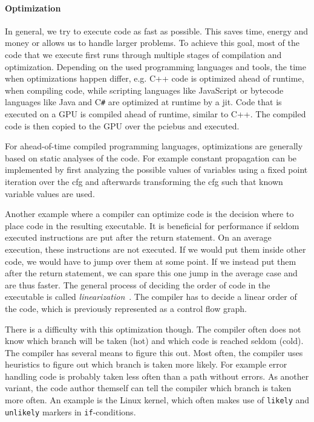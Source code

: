 \paragraph{Optimization} In general, we try to execute code as fast as possible. This saves time, energy and money or allows us to handle larger problems. To achieve this goal, most of the code that we execute first runs through multiple stages of compilation and optimization. Depending on the used programming languages and tools, the time when optimizations happen differ, e.g. C++ code is optimized ahead of runtime, when compiling code, while scripting languages like JavaScript or bytecode languages like Java and C\texttt{\#} are optimized at runtime by a \gls{jit}. Code that is executed on a GPU is compiled ahead of runtime, similar to C++. The compiled code is then copied to the GPU over the \gls{pciebus} and executed.

For ahead-of-time compiled programming languages, optimizations are generally based on static analyses of the code. For example constant propagation can be implemented by first analyzing the possible values of variables using a fixed point iteration over the \gls{cfg} and afterwards transforming the \gls{cfg} such that known variable values are used.~\cite{Seidl2010}

Another example where a compiler can optimize code is the decision where to place code in the resulting executable. It is beneficial for performance if seldom executed instructions are put after the return statement. On an average execution, these instructions are not executed. If we would put them inside other code, we would have to jump over them at some point. If we instead put them after the return statement, we can spare this one jump in the average case and are thus faster. The general process of deciding the order of code in the executable is called \emph{linearization}~\cite{Seidl2010}. The compiler has to decide a linear order of the code, which is previously represented as a control flow graph.

There is a difficulty with this optimization though. The compiler often does not know which branch will be taken (hot) and which code is reached seldom (cold). The compiler has several means to figure this out. Most often, the compiler uses heuristics to figure out which branch is taken more likely. For example error handling code is probably taken less often than a path without errors. As another variant, the code author themself can tell the compiler which branch is taken more often. An example is the Linux kernel, which often makes use of \texttt{likely} and \texttt{unlikely} markers in \texttt{if}-conditions.

